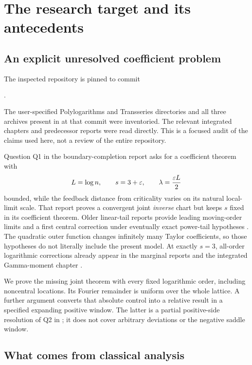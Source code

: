 \section{The research target and its antecedents}
\label{sec:scope}

\subsection{An explicit unresolved coefficient problem}

The inspected repository is pinned to commit
\begin{center}\small\pin.\end{center}
The user-specified Polylogarithms and Transseries directories and all
three archives present in  at that commit were
inventoried. The relevant integrated chapters and predecessor reports
were read directly. This is a focused audit of the claims used here,
not a review of the entire repository.

Question Q1 in the boundary-completion report \cite{repo-boundary}
asks for a coefficient theorem with
\begin{equation}\label{eq:window}
 L=\log n,\qquad s=3+\varepsilon,\qquad
 \lambda=\frac{\varepsilon L}{2}
\end{equation}
bounded, while the feedback distance from criticality varies on its
natural local-limit scale. That report proves a convergent joint
\emph{inverse} chart but keeps $s$ fixed in its coefficient theorem.
Older linear-tail reports provide leading moving-order limits and a
first central correction under eventually exact power-tail hypotheses
\cite{repo-gaussian,repo-confluent}. The quadratic outer function changes
infinitely many Taylor coefficients, so those hypotheses do not
literally include the present model. At exactly $s=3$, all-order
logarithmic corrections already appear in the marginal reports and the
integrated Gamma-moment chapter \cite{repo-marginal,repo-moments}.

We prove the missing joint theorem with every fixed logarithmic order,
including noncentral locations. Its Fourier remainder is uniform over
the whole lattice. A further argument converts that absolute control
into a relative result in a specified expanding positive window.
The latter is a partial positive-side resolution of Q2 in
\cite{repo-boundary}; it does not cover arbitrary deviations or the
negative saddle window.

\subsection{What comes from classical analysis}

